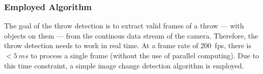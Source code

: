 \subsubsection{Employed Algorithm}
\label{subsubsec:algorithm}











The goal of the throw detection is to extract valid frames of a throw --- with objects on them --- from the continous data stream of the camera.
Therefore, the throw detection needs to work in real time.
At a frame rate of \SI{200}{fps}, there is $<\SI{5}{ms}$ to process a single frame (without the use of parallel computing).
Due to this time constraint, a simple image change detection algorithm is employed.


